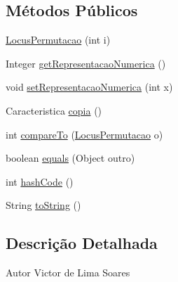 \subsection*{Métodos Públicos}
\begin{DoxyCompactItemize}
\item 
\hyperlink{classic_1_1populacional_1_1seres_1_1permutacoes_1_1_locus_permutacao_a07ba9c689e4f7fc03c30e7ef00e8dbf1}{Locus\-Permutacao} (int i)
\item 
Integer \hyperlink{classic_1_1populacional_1_1seres_1_1permutacoes_1_1_locus_permutacao_a849fa3ef6ee79cb3ec71a7323ad131c6}{get\-Representacao\-Numerica} ()
\item 
void \hyperlink{classic_1_1populacional_1_1seres_1_1permutacoes_1_1_locus_permutacao_af563826526caf7402392697602f367be}{set\-Representacao\-Numerica} (int x)
\item 
Caracteristica \hyperlink{classic_1_1populacional_1_1seres_1_1permutacoes_1_1_locus_permutacao_a0745097e35453049b470107363abd6e0}{copia} ()
\item 
int \hyperlink{classic_1_1populacional_1_1seres_1_1permutacoes_1_1_locus_permutacao_acb814e494ea4b3b7b8a9acda72104af8}{compare\-To} (\hyperlink{classic_1_1populacional_1_1seres_1_1permutacoes_1_1_locus_permutacao}{Locus\-Permutacao} o)
\item 
boolean \hyperlink{classic_1_1populacional_1_1seres_1_1permutacoes_1_1_locus_permutacao_ae9e522a0b98639d8dd7c21646a33cc53}{equals} (Object outro)
\item 
int \hyperlink{classic_1_1populacional_1_1seres_1_1permutacoes_1_1_locus_permutacao_af877fffd3f0fd8d0218269ccb7d5e506}{hash\-Code} ()
\item 
String \hyperlink{classic_1_1populacional_1_1seres_1_1permutacoes_1_1_locus_permutacao_ab2d66ef8ea02280c87acad9642892ff7}{to\-String} ()
\end{DoxyCompactItemize}


\subsection{Descrição Detalhada}
\begin{DoxyAuthor}{Autor}
Victor de Lima Soares 
\end{DoxyAuthor}


